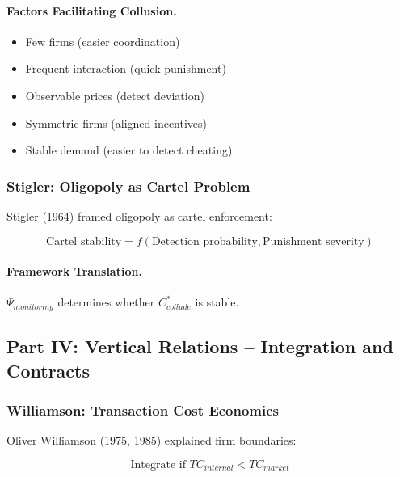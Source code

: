 \paragraph{Factors Facilitating Collusion.}
\begin{itemize}
    \item Few firms (easier coordination)
    \item Frequent interaction (quick punishment)
    \item Observable prices (detect deviation)
    \item Symmetric firms (aligned incentives)
    \item Stable demand (easier to detect cheating)
\end{itemize}

\subsubsection{Stigler: Oligopoly as Cartel Problem}

Stigler (1964) framed oligopoly as cartel enforcement:

\begin{equation}
\text{Cartel stability} = f(\text{Detection probability}, \text{Punishment severity})
\end{equation}

\paragraph{Framework Translation.}
$\Psi_{monitoring}$ determines whether $C^*_{collude}$ is stable.

\subsection{Part IV: Vertical Relations – Integration and Contracts}

\subsubsection{Williamson: Transaction Cost Economics}

Oliver Williamson (1975, 1985) explained firm boundaries:

\begin{equation}
\boxed{
\text{Integrate if } TC_{internal} < TC_{market}
}
\label{eq:williamson}
\end{equation}

